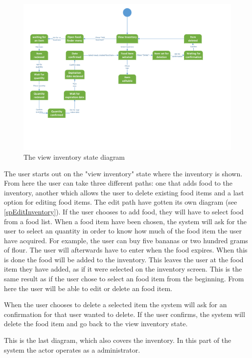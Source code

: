 \begin{figure}[H]
	\centering
	\includegraphics[width=1.0\textwidth]{ApplicationDomain/spViewInventory.pdf} 
	\caption{The view inventory state diagram}
	\label{Inventory_Figure}
\end{figure}
The user starts out on the "view inventory" state where the inventory is shown. From here the user can take three different paths: one that adds food to the inventory, another which allows the user to delete existing food items and a last option for editing food items. The edit path have gotten its own diagram (see \ref{spEditInventory}). If the user chooses to add food, they will have to select food from a food list. When a food item have been chosen, the system will ask for the user to select an quantity in order to know how much of the food item the user have acquired. For example, the user can buy five bananas or two hundred grams of flour. The user will afterwards have to enter when the food expires. When this is done the food will be added to the inventory. This leaves the user at the food item they have added, as if it were selected on the inventory screen. This is the same result as if the user chose to select an food item from the beginning. From here the user will be able to edit or delete an food item. 

When the user chooses to delete a selected item the system will ask for an confirmation for that user wanted to delete. If the user confirms, the system will delete the food item and go back to the view inventory state.


This is the last diagram, which also covers the inventory. In this part of the system the actor operates as a administrator.

